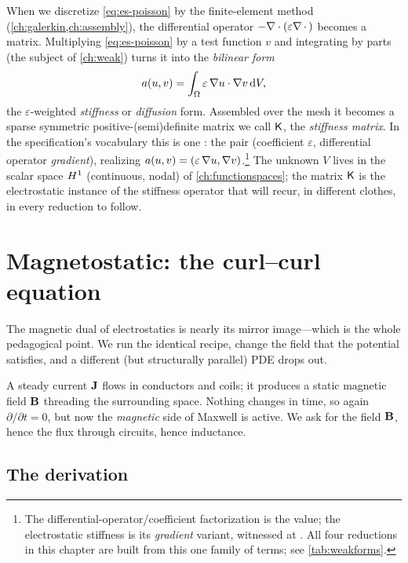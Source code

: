 When we discretize \cref{eq:es-poisson} by the finite-element method
(\cref{ch:galerkin,ch:assembly}), the differential operator
$-\nabla\cdot(\varepsilon\nabla\,\cdot\,)$ becomes a matrix. Multiplying
\cref{eq:es-poisson} by a test function $v$ and integrating by parts (the subject
of \cref{ch:weak}) turns it into the \emph{bilinear form}
\begin{equation}
  a(u,v) = \int_\Omega \varepsilon\,\nabla u\cdot\nabla v \,\mathrm{d}V,
  \label{eq:es-bilinear}
\end{equation}
the $\varepsilon$-weighted \emph{stiffness} or \emph{diffusion} form. Assembled
over the mesh it becomes a sparse symmetric positive-(semi)definite matrix we
call $\mathsf{K}$, the \emph{stiffness matrix}. In the specification's vocabulary this
is one : the pair (coefficient $\varepsilon$, differential
operator \emph{gradient}), realizing $a(u,v)=(\varepsilon\,\nabla u,\nabla
v)$.\footnote{The differential-operator/coefficient factorization is the
 value; the electrostatic stiffness is its
\emph{gradient} variant, witnessed at
. All four reductions in this
chapter are built from this one family of terms; see
\cref{tab:weakforms}.} The unknown $V$ lives in the scalar space $H^1$
(continuous, nodal) of \cref{ch:functionspaces}; the matrix $\mathsf{K}$ is the
electrostatic instance of the stiffness operator that will recur, in different
clothes, in every reduction to follow.

\section{Magnetostatic: the curl--curl equation}
\label{sec:magnetostatic}

The magnetic dual of electrostatics is nearly its mirror image---which is the
whole pedagogical point. We run the identical recipe, change the field that the
potential satisfies, and a different (but structurally parallel) PDE drops out.

\begin{physicsbox}
A steady current $\mathbf{J}$ flows in conductors and coils; it produces a static
magnetic field $\mathbf{B}$ threading the surrounding space. Nothing changes in
time, so again $\partial/\partial t = 0$, but now the \emph{magnetic} side of
Maxwell is active. We ask for the field $\mathbf{B}$, hence the flux through circuits,
hence inductance.
\end{physicsbox}

\subsection{The derivation}

